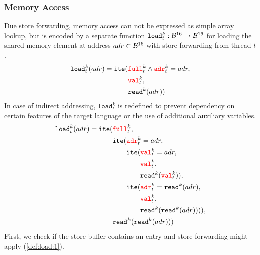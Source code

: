 \subsubsection*{Memory Access}

\newcommand{\LOAD}{\texttt{load}}

Due store forwarding, memory access can not be expressed as simple array lookup, but is encoded by a separate function $\LOAD^k_t: \BVSORT \to \BVSORT$ for loading the shared memory element at address $adr \in \mathcal{B}^{16}$ with store forwarding from thread $t$. %
\begin{align*}
  \LOAD^k_t(adr) = \ITE(& \SBFULL^k_t \land \SBADR^k_t = adr, \\
  & \SBVAL^k_t, \\
  & \READ^k(adr))
\end{align*}
In case of indirect addressing, $\LOAD^k_t$ is redefined to prevent dependency on certain features of the target language or the use of additional auxiliary variables.
\begin{align}
  \LOAD^k_t(adr) = \ITE(& \SBFULL^k_t, \label{def:load:1} \\
  & \ITE(\SBADR^k_t = adr, \label{def:load:2} \\
  & \ITEindent \ITE(\SBVAL^k_t = adr, \label{def:load:3} \\
  & \ITEindent \ITEindent \SBVAL^k_t, \label{def:load:4} \\
  & \ITEindent \ITEindent \READ^k(\SBVAL^k_t)), \label{def:load:5} \\
  & \ITEindent \ITE(\SBADR^k_t = \READ^k(adr), \label{def:load:6} \\
  & \ITEindent \ITEindent \SBVAL^k_t, \label{def:load:7}\\
  & \ITEindent \ITEindent \READ^k(\READ^k(adr)))), \label{def:load:8} \\
  & \READ^k(\READ^k(adr))) \label{def:load:9}
\end{align}
First, we check if the store buffer contains an entry and store forwarding might apply (\ref{def:load:1}).
